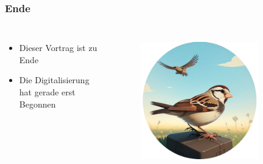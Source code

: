 \begin{frame}
\frametitle{Ende}

\begin{columns}

\begin{itemize}
\item Dieser Vortrag ist zu Ende
\item Die Digitalisierung hat gerade erst Begonnen
\end{itemize}

\begin{figure}
  \includegraphics[width=0.8\textwidth]{figures/loading.png}
  \label{fig:prince}
\end{figure}
\end{columns}

\end{frame}




